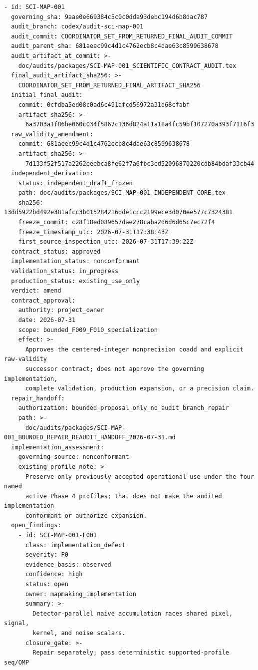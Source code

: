 \documentclass[11pt]{article}
\begin{document}
\begin{small}
\begin{verbatim}
- id: SCI-MAP-001
  governing_sha: 9aae0e669384c5c0c0dda93debc194d6b8dac787
  audit_branch: codex/audit-sci-map-001
  audit_commit: COORDINATOR_SET_FROM_RETURNED_FINAL_AUDIT_COMMIT
  audit_parent_sha: 681aeec99c4d1c4762ecb8c4dae63c8599638678
  audit_artifact_at_commit: >-
    doc/audits/packages/SCI-MAP-001_SCIENTIFIC_CONTRACT_AUDIT.tex
  final_audit_artifact_sha256: >-
    COORDINATOR_SET_FROM_RETURNED_FINAL_ARTIFACT_SHA256
  initial_final_audit:
    commit: 0cfdba5ed08c0ad6c491afcd56972a31d68cfabf
    artifact_sha256: >-
      6a3703a1f86be060c034f5867c136d824a11a18a4fc59bf107270a393f7116f3
  raw_validity_amendment:
    commit: 681aeec99c4d1c4762ecb8c4dae63c8599638678
    artifact_sha256: >-
      7d133f52f517a2262eeebca8fe62f7a6fbc3ed52096870220cdb84bdaf33cb44
  independent_derivation:
    status: independent_draft_frozen
    path: doc/audits/packages/SCI-MAP-001_INDEPENDENT_CORE.tex
    sha256: 13dd5922bd492e381afcc3b015284216dde1ccc2199ece3d070ee577c7324381
    freeze_commit: c28f18ed089657dae278caba2d6d6d65c7ec72f4
    freeze_timestamp_utc: 2026-07-31T17:38:43Z
    first_source_inspection_utc: 2026-07-31T17:39:22Z
  contract_status: approved
  implementation_status: nonconformant
  validation_status: in_progress
  production_status: existing_use_only
  verdict: amend
  contract_approval:
    authority: project_owner
    date: 2026-07-31
    scope: bounded_F009_F010_specialization
    effect: >-
      Approves the centered-integer nonprecision coadd and explicit raw-validity
      successor contract; does not approve the governing implementation,
      complete validation, production expansion, or a precision claim.
  repair_handoff:
    authorization: bounded_proposal_only_no_audit_branch_repair
    path: >-
      doc/audits/packages/SCI-MAP-001_BOUNDED_REPAIR_REAUDIT_HANDOFF_2026-07-31.md
  implementation_assessment:
    governing_source: nonconformant
    existing_profile_note: >-
      Preserve only previously accepted operational use under the four named
      active Phase 4 profiles; that does not make the audited implementation
      conformant or authorize expansion.
  open_findings:
    - id: SCI-MAP-001-F001
      class: implementation_defect
      severity: P0
      evidence_basis: observed
      confidence: high
      status: open
      owner: mapmaking_implementation
      summary: >-
        Detector-parallel naive accumulation races shared pixel, signal,
        kernel, and noise scalars.
      closure_gate: >-
        Repair separately; pass deterministic supported-profile seq/OMP

\end{verbatim}
\end{small}
\end{document}
